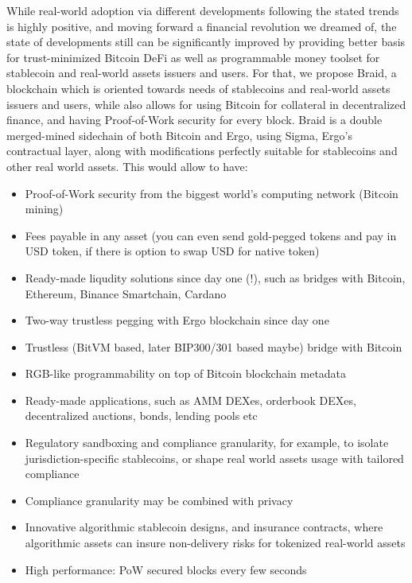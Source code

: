 \documentclass{llncs}   %
\newcommand{\bc}{Braid}
\begin{document}
While real-world adoption via different developments following the stated trends is highly positive, and moving forward a financial revolution we dreamed of, the state of developments still can be significantly improved by providing better basis for trust-minimized  Bitcoin DeFi as well as programmable money toolset for stablecoin and real-world assets issuers and users. For that, we propose \bc{}, a blockchain which is oriented towards needs of stablecoins and real-world assets  issuers and users, while also allows for using Bitcoin for collateral in decentralized finance, and having Proof-of-Work security for every block. \bc{} is a double merged-mined sidechain of both Bitcoin and Ergo, using Sigma, Ergo's contractual layer, along with modifications perfectly suitable for stablecoins and other real world assets. This would allow to have:

\begin{itemize}
  \item Proof-of-Work security from the biggest world's computing network (Bitcoin mining)
  \item Fees payable in any asset (you can even send gold-pegged tokens and pay in USD token, if there is option to swap USD for native token)
  \item Ready-made liqudity solutions since day one (!), such as bridges with Bitcoin, Ethereum, Binance Smartchain, Cardano
  \item Two-way trustless pegging with Ergo blockchain since day one
  \item Trustless (BitVM based, later BIP300/301 based maybe) bridge with Bitcoin
  \item RGB-like programmability on top of Bitcoin blockchain metadata
  \item Ready-made applications, such as AMM DEXes, orderbook DEXes, decentralized auctions, bonds, lending pools etc
  \item Regulatory sandboxing and compliance granularity, for example, to isolate jurisdiction-specific stablecoins, or shape real world assets usage with tailored compliance
  \item Compliance granularity may be combined with privacy
  \item Innovative algorithmic stablecoin designs, and insurance contracts, where algorithmic assets can insure non-delivery risks for tokenized real-world assets
  \item High performance: PoW secured blocks every few seconds
\end{itemize}
\end{document}
